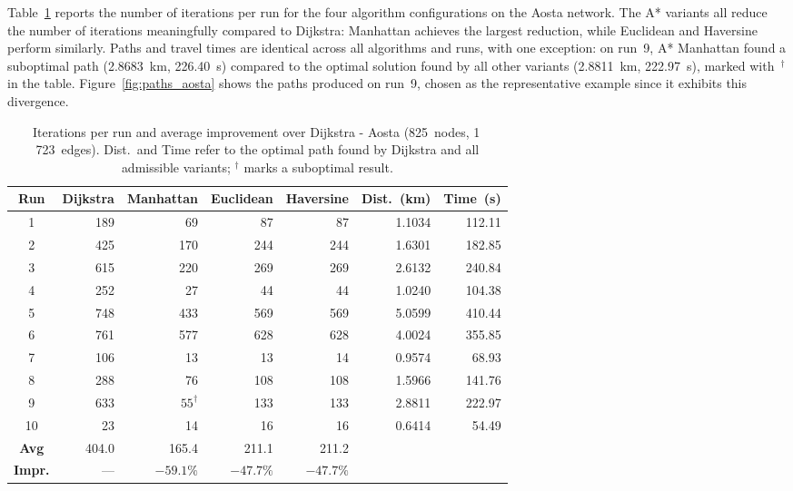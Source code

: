 \documentclass[12pt,a4paper]{article}
\begin{document}
Table~\ref{tab:results_aosta} reports the number of iterations per run for the four algorithm configurations on the Aosta network.
The A* variants all reduce the number of iterations meaningfully compared to Dijkstra: Manhattan achieves the largest reduction, while Euclidean and Haversine perform similarly.
Paths and travel times are identical across all algorithms and runs, with one exception: on run~9, A* Manhattan found a suboptimal path (2.8683~km, 226.40~s) compared to the optimal solution found by all other variants (2.8811~km, 222.97~s), marked with~$^\dagger$ in the table.
Figure~\ref{fig:paths_aosta} shows the paths produced on run~9, chosen as the representative example since it exhibits this divergence.

\begin{table}[H]
  \centering
  \small
  \setlength{\tabcolsep}{5pt}
  \begin{tabular}{crrrrrr}
    \toprule
    \textbf{Run} & \textbf{Dijkstra} & \textbf{Manhattan} & \textbf{Euclidean} & \textbf{Haversine} & \textbf{Dist.~(km)} & \textbf{Time~(s)} \\
    \midrule
    1  & 189 &   69 &  87 &  87 & 1.1034 & 112.11 \\
    2  & 425 &  170 & 244 & 244 & 1.6301 & 182.85 \\
    3  & 615 &  220 & 269 & 269 & 2.6132 & 240.84 \\
    4  & 252 &   27 &  44 &  44 & 1.0240 & 104.38 \\
    5  & 748 &  433 & 569 & 569 & 5.0599 & 410.44 \\
    6  & 761 &  577 & 628 & 628 & 4.0024 & 355.85 \\
    7  & 106 &   13 &  13 &  14 & 0.9574 &  68.93 \\
    8  & 288 &   76 & 108 & 108 & 1.5966 & 141.76 \\
    9  & 633 & $55^\dagger$ & 133 & 133 & 2.8811 & 222.97 \\
    10 &  23 &   14 &  16 &  16 & 0.6414 &  54.49 \\
    \midrule
    \textbf{Avg}   & 404.0 &  165.4 & 211.1 & 211.2 & & \\
    \textbf{Impr.} & ---   & $-59.1\%$ & $-47.7\%$ & $-47.7\%$ & & \\
    \bottomrule
  \end{tabular}
  \caption{Iterations per run and average improvement over Dijkstra - Aosta (825~nodes, 1\,723~edges). Dist.\ and Time refer to the optimal path found by Dijkstra and all admissible variants; $^\dagger$ marks a suboptimal result.}
  \label{tab:results_aosta}
\end{table}
\end{document}
